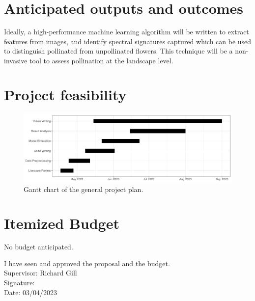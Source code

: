 \documentclass[11pt,a4paper]{article}
\begin{document}
\begin{spacing}{1.5}
\section{Anticipated outputs and outcomes}

Ideally, a high-performance machine learning algorithm will be written to extract features from images, and identify spectral signatures captured which can be used to distinguish pollinated from unpollinated flowers. This technique will be a non-invasive tool to assess pollination at the landscape level.

\section{Project feasibility}

\begin{figure}[H]
    \centering
    \includegraphics[scale = 0.55]{Gantt_chart.pdf}
    \caption{Gantt chart of the general project plan.}
    \label{fig:Gantt_chart}
\end{figure}

\section{Itemized Budget}

No budget anticipated. 




\pagebreak

I have seen and approved the proposal and the budget. \\

Supervisor: Richard Gill\\

Signature: \\

Date: 03/04/2023

\end{spacing}
\end{document}
